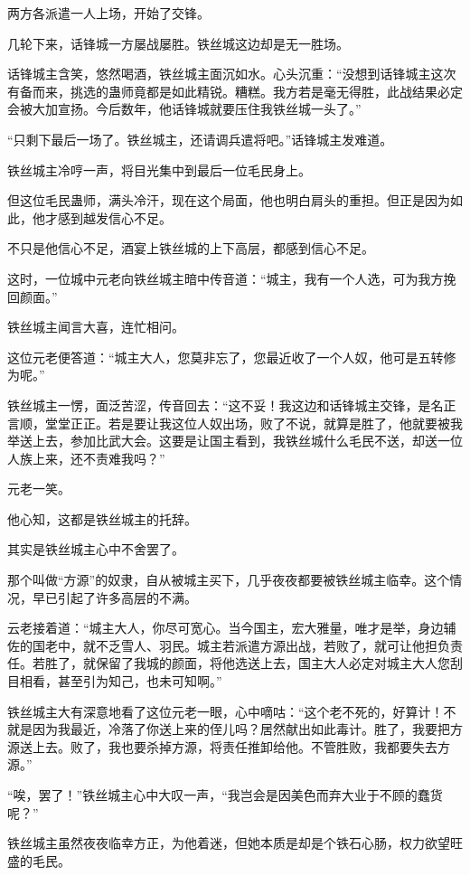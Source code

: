 \begin{this_body}
两方各派遣一人上场，开始了交锋。

几轮下来，话锋城一方屡战屡胜。铁丝城这边却是无一胜场。

话锋城主含笑，悠然喝酒，铁丝城主面沉如水。心头沉重：“没想到话锋城主这次有备而来，挑选的蛊师竟都是如此精锐。糟糕。我方若是毫无得胜，此战结果必定会被大加宣扬。今后数年，他话锋城就要压住我铁丝城一头了。”

“只剩下最后一场了。铁丝城主，还请调兵遣将吧。”话锋城主发难道。

铁丝城主冷哼一声，将目光集中到最后一位毛民身上。

但这位毛民蛊师，满头冷汗，现在这个局面，他也明白肩头的重担。但正是因为如此，他才感到越发信心不足。

不只是他信心不足，酒宴上铁丝城的上下高层，都感到信心不足。

这时，一位城中元老向铁丝城主暗中传音道：“城主，我有一个人选，可为我方挽回颜面。”

铁丝城主闻言大喜，连忙相问。

这位元老便答道：“城主大人，您莫非忘了，您最近收了一个人奴，他可是五转修为呢。”

铁丝城主一愣，面泛苦涩，传音回去：“这不妥！我这边和话锋城主交锋，是名正言顺，堂堂正正。若是要让我这位人奴出场，败了不说，就算是胜了，他就要被我举送上去，参加比武大会。这要是让国主看到，我铁丝城什么毛民不送，却送一位人族上来，还不责难我吗？”

元老一笑。

他心知，这都是铁丝城主的托辞。

其实是铁丝城主心中不舍罢了。

那个叫做“方源”的奴隶，自从被城主买下，几乎夜夜都要被铁丝城主临幸。这个情况，早已引起了许多高层的不满。

云老接着道：“城主大人，你尽可宽心。当今国主，宏大雅量，唯才是举，身边辅佐的国老中，就不乏雪人、羽民。城主若派遣方源出战，若败了，就可让他担负责任。若胜了，就保留了我城的颜面，将他选送上去，国主大人必定对城主大人您刮目相看，甚至引为知己，也未可知啊。”

铁丝城主大有深意地看了这位元老一眼，心中嘀咕：“这个老不死的，好算计！不就是因为我最近，冷落了你送上来的侄儿吗？居然献出如此毒计。胜了，我要把方源送上去。败了，我也要杀掉方源，将责任推卸给他。不管胜败，我都要失去方源。”

“唉，罢了！”铁丝城主心中大叹一声，“我岂会是因美色而弃大业于不顾的蠢货呢？”

铁丝城主虽然夜夜临幸方正，为他着迷，但她本质是却是个铁石心肠，权力欲望旺盛的毛民。


\end{this_body}
